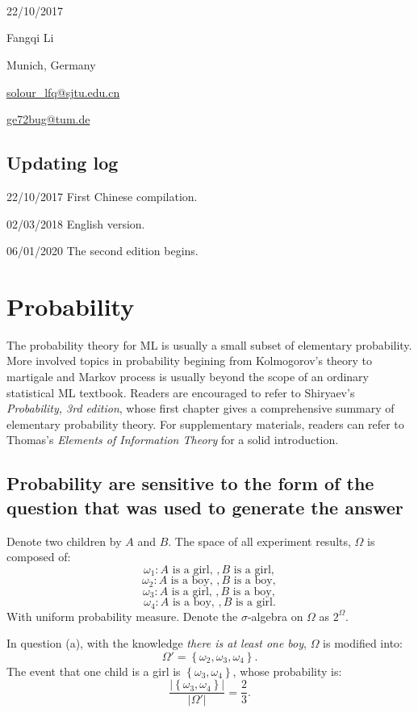 \documentclass[UTF8]{ctexart}
\begin{document}
\

\

\

22/10/2017

Fangqi Li

Munich, Germany

\url{solour_lfq@sjtu.edu.cn}

\url{ge72bug@tum.de}

\newpage
\subsection{Updating log}
22/10/2017 First Chinese compilation.

02/03/2018 English version.

06/01/2020 The second edition begins.

\newpage
\section{Probability}
The probability theory for ML is usually a small subset of elementary probability.
More involved topics in probability begining from Kolmogorov's theory to martigale and Markov process is usually beyond the scope of an ordinary statistical ML textbook.
Readers are encouraged to refer to Shiryaev's \emph{Probability, 3rd edition}, whose first chapter gives a comprehensive summary of elementary probability theory.
For supplementary materials, readers can refer to Thomas's \emph{Elements of Information Theory} for a solid introduction.

\subsection{Probability are sensitive to the form of the question that was used to generate the answer}
Denote two children by $A$ and $B$.
The space of all experiment results, $\Omega$ is composed of:
$$\omega_{1}:A\text{ is a girl, },B\text{ is a girl},$$
$$\omega_{2}:A\text{ is a boy, },B\text{ is a boy},$$
$$\omega_{3}:A\text{ is a girl, },B\text{ is a boy},$$
$$\omega_{4}:A\text{ is a boy, },B\text{ is a girl}.$$
With uniform probability measure.
Denote the $\sigma$-algebra on $\Omega$ as $2^{\Omega}$.

In question (a), with the knowledge \emph{there is at least one boy}, $\Omega$ is modified into:
$$\Omega'=\left\{\omega_{2},\omega_{3},\omega_{4} \right\}.$$
The event that one child is a girl is $\left\{\omega_{3},\omega_{4} \right\}$, whose probability is:
$$\frac{|\left\{\omega_{3},\omega_{4} \right\}|}{|\Omega'|}=\frac{2}{3}.$$
\end{document}
